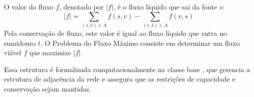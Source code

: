 O valor do fluxo $f$, denotado por $|f|$, é o fluxo líquido que sai da fonte $s$:
\begin{equation}
    |f| = \sum_{(s,v) \in A} f(s,v) - \sum_{(v,s) \in A} f(v,s)
\end{equation}
Pela conservação de fluxo, este valor é igual ao fluxo líquido que entra no sumidouro $t$. O Problema do Fluxo Máximo consiste em determinar um fluxo viável $f$ que maximize $|f|$.

Essa estrutura é formalizada computacionalmente na classe base , que gerencia a estrutura de adjacência da rede e assegura que as restrições de capacidade e conservação sejam mantidas.


